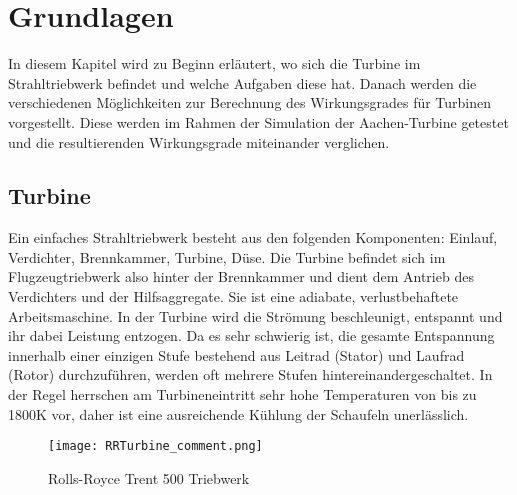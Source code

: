 \chapter{Grundlagen}
In diesem Kapitel wird zu Beginn erläutert, wo sich die Turbine im Strahltriebwerk befindet und welche Aufgaben diese hat. Danach werden die verschiedenen Möglichkeiten zur Berechnung des Wirkungsgrades für Turbinen vorgestellt. Diese werden im Rahmen der Simulation der Aachen-Turbine getestet und die resultierenden Wirkungsgrade miteinander verglichen.

\section{Turbine}
Ein einfaches Strahltriebwerk besteht aus den folgenden Komponenten: Einlauf, Verdichter, Brennkammer, Turbine, Düse. Die Turbine befindet sich im Flugzeugtriebwerk also hinter der Brennkammer und dient dem Antrieb des Verdichters und der Hilfsaggregate. Sie ist eine adiabate, verlustbehaftete Arbeitsmaschine. In der Turbine wird die Strömung beschleunigt, entspannt und ihr dabei Leistung entzogen. Da es sehr schwierig ist, die gesamte Entspannung innerhalb einer einzigen Stufe bestehend aus Leitrad (Stator) und Laufrad (Rotor) durchzuführen, werden oft mehrere Stufen hintereinandergeschaltet. In der Regel herrschen am Turbineneintritt sehr hohe Temperaturen von bis zu 1800K vor, daher ist eine ausreichende Kühlung der Schaufeln unerlässlich.


\begin{figure}[htbp]
	\centering
	\texttt{[image: RRTurbine\_comment.png]}
	\caption{Rolls-Royce Trent 500 Triebwerk \cite{RRFlickr}} \label{fig:RRTurbine}
\end{figure} 


